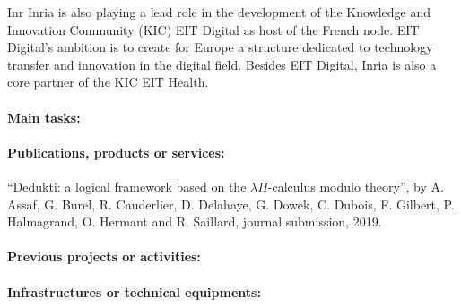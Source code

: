 \begin{sitedescription}{Inr}
Inria is also playing a lead role in the development of the Knowledge and Innovation Community (KIC) EIT Digital as host of the French node. EIT Digital’s ambition is to create for Europe a structure dedicated to technology transfer and innovation in the digital field. Besides EIT Digital, Inria is also a core partner of the KIC EIT Health.

\paragraph{Main tasks:}


\begin{compactitem}
\item{}
\end{compactitem}

\paragraph{Publications, products or services:}


\begin{compactitem}
\item ``Dedukti: a logical framework based on the $\lambda\Pi$-calculus modulo theory'', by A. Assaf, G. Burel, R. Cauderlier, D. Delahaye, G. Dowek, C. Dubois, F. Gilbert, P. Halmagrand, O. Hermant and R. Saillard, journal submission, 2019.
\end{compactitem}

\paragraph{Previous projects or activities:}


\begin{compactitem}
\item 
\end{compactitem}

\paragraph{Infrastructures or technical equipments:}


\end{sitedescription}
